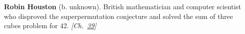 \textbf{Robin Houston} (b. unknown). British mathematician and computer scientist who disproved the superpermutation conjecture and solved the sum of three cubes problem for 42. \emph{[Ch.~\hyperref[ch:superpermutationsbreakthrough]{39}]}


